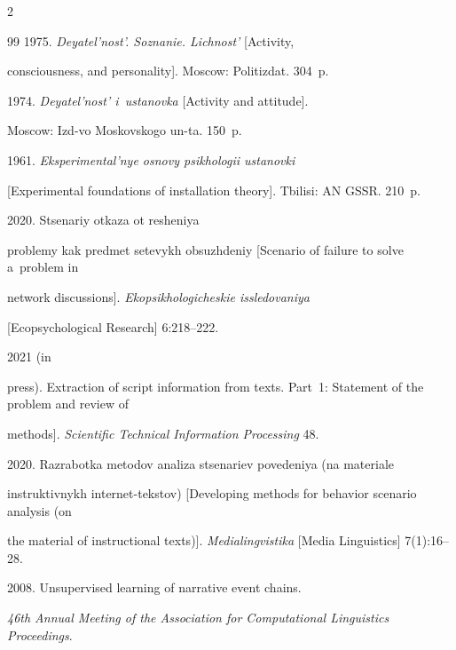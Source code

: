 \begin{multicols}{2}
{{\begin{thebibliography}{99}
   1975. \textit{Deyatel'nost'. Soznanie. Lichnost'} [Activity, 

consciousness, and personality]. Moscow: Po\-lit\-iz\-dat. 304~p.


   1974. \textit{Deyatel'nost' i~ustanovka} [Activity and attitude]. 

Moscow: Izd-vo Moskovskogo un-ta. 150~p.


   1961. \textit{Eksperimental'nye osnovy psikhologii ustanovki} 

[Experimental foundations of installation theory]. Tbilisi: AN GSSR. 210~p.


   2020. Stsenariy otkaza ot resheniya 

problemy kak predmet setevykh obsuzhdeniy [Scenario of failure to solve a~problem in 

network discussions]. \textit{Ekopsikhologicheskie issledovaniya} 

[Ecopsychological Research] 6:218--222.


   2021 (in 

press). Extraction of script information from texts. Part~1: Statement of the problem and review of 

methods]. \textit{Scientific Technical Information Processing} 48.


   2020. Razrabotka metodov analiza stsenariev povedeniya (na materiale 

instruktivnykh internet-tekstov) [Developing methods for behavior scenario analysis (on 

the material of instructional texts)]. \textit{Medialingvistika} [Media Linguistics] 7(1):16--28.


   2008. Unsupervised learning of narrative event chains. 

\textit{46th Annual Meeting of the Association for Computational Linguistics Proceedings}. 


\end{thebibliography}}}
\end{multicols}
